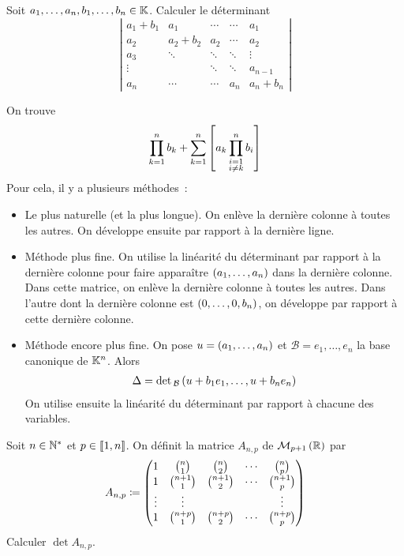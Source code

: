 \documentclass{magnolia}
\begin{document}
Soit $a_1,\ldots,a_n,b_1,\ldots,b_n\in\mathbb{K}$. Calculer le déterminant
\[\left|
\begin{array}{ccccc}
a_1+b_1 & a_1 & \cdots & \cdots & a_1\\
a_2 & a_2+b_2 & a_2 & \cdots & a_2\\
a_3 & \ddots & \ddots & \ddots & \vdots\\
\vdots & & \ddots & \ddots & a_{n-1}\\
a_n & \cdots & \cdots & a_n & a_n+b_n
\end{array}
\right|\]

\begin{sol}
On trouve
  \[\prod_{k=1}^n b_k+\sum_{k=1}^n
    \left[a_k \prod_{\substack{i=1\\i\neq k}}^n b_i\right]\]
  Pour cela, il y a plusieurs méthodes~:
  \begin{itemize}
  \item Le plus naturelle (et la plus longue). On enlève la dernière colonne
    à toutes les autres. On développe ensuite par rapport à la dernière ligne.
  \item Méthode plus fine. On utilise la linéarité du déterminant par rapport
    à la dernière colonne pour faire apparaître $\left(a_1,\ldots,a_n\right)$ dans la
    dernière colonne. Dans cette matrice, on enlève la dernière colonne à
    toutes les autres. Dans l'autre dont la dernière colonne est
    $\left(0,\ldots,0,b_n\right)$, on développe par rapport à cette dernière colonne.
  \item Méthode encore plus fine. On pose $u=\left(a_1,\ldots,a_n\right)$ et
    $\mathcal{B}=e_1,\ldots,e_n$ la base canonique de $\mathbb{K}^n$. Alors
    \begin{eqnarray*}
    \Delta=\mathop{\rm det}{}_{\mathcal{B}}\left(u+b_1 e_1,\ldots,u+b_n e_n\right)
    \end{eqnarray*}
    On utilise ensuite la linéarité du déterminant par rapport à chacune des
    variables.
  \end{itemize}
\end{sol}

Soit $n\in{\mathbb{N}^*}$ et $p\in\left\llbracket 1,n\right\rrbracket$. On définit la matrice $A_{n,p}$
de $\mathcal{M}_{p+1}\left(\mathbb{R}\right)$ par
\[A_{n,p}\coloneqq
  \begin{pmatrix}
  1 & \binom{n}{1} & \binom{n}{2} & \cdots & \binom{n}{p}\\ 
  1 & \binom{n+1}{1} & \binom{n+1}{2} & \cdots & \binom{n+1}{p}\\ 
  \vdots & \vdots &  &  & \vdots\\ 
  1 & \binom{n+p}{1} & \binom{n+p}{2} & \cdots & \binom{n+p}{p}
  \end{pmatrix}\]
Calculer $\det A_{n,p}$.
\end{document}
